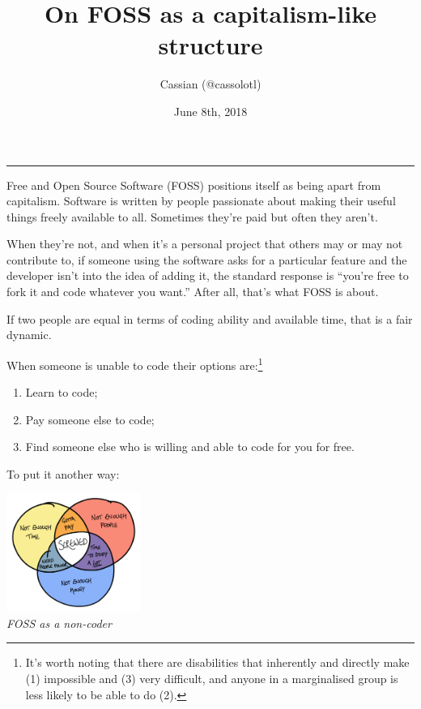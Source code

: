 \documentclass[10pt]{article}
\title{On FOSS as a capitalism-like structure}
\author{Cassian (@cassolotl)}
\date{June 8th, 2018}
\begin{document}
\maketitle

\begin{center}
\noindent\rule{8cm}{0.4pt}
\end{center}

\begin{multicols}{2}
Free and Open Source Software (FOSS) positions itself as being apart from capitalism. Software is written by people passionate about making their useful things freely available to all. Sometimes they’re paid but often they aren’t.

When they’re not, and when it’s a personal project that others may or may not contribute to, if someone using the software asks for a particular feature and the developer isn’t into the idea of adding it, the standard response is “you’re free to fork it and code whatever you want.” After all, that’s what FOSS is about.

If two people are equal in terms of coding ability and available time, that is a fair dynamic.

When someone is unable to code their options are:\footnote{It’s worth noting that there are disabilities that inherently and directly make (1) impossible and (3) very difficult, and anyone in a marginalised group is less likely to be able to do (2).}

\begin{enumerate}
\item Learn to code;
\item Pay someone else to code;
\item Find someone else who is willing and able to code for you for free.
\end{enumerate}

To put it another way:

\begin{center}
\includegraphics[width=0.33\textwidth]{foss-as-non-dev}\\
\emph{FOSS as a non-coder}
\end{center}


\end{multicols}
\end{document}
